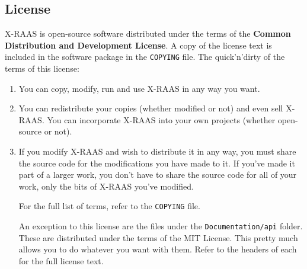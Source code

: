 \documentclass[a4paper,12pt]{article}
\begin{document}
\subsection{License}

X-RAAS is open-source software distributed under the terms of the
\textbf{Common Distribution and Development License}. A copy of the
license text is included in the software package in the \texttt{COPYING}
file. The quick'n'dirty of the terms of this license:

\begin{enumerate}

\item You can copy, modify, run and use X-RAAS in any way you want.

\item You can redistribute your copies (whether modified or not) and even
sell X-RAAS. You can incorporate X-RAAS into your own projects (whether
open-source or not).

\item If you modify X-RAAS and wish to distribute it in any way, you must
share the source code for the modifications you have made to it. If
you've made it part of a larger work, you don't have to share the source
code for all of your work, only the bits of X-RAAS you've modified.

For the full list of terms, refer to the \texttt{COPYING} file.

An exception to this license are the files under the
\texttt{Documentation/api} folder. These are distributed under the terms
of the MIT License. This pretty much allows you to do whatever you want
with them. Refer to the headers of each for the full license text.

\end{enumerate}
\end{document}
